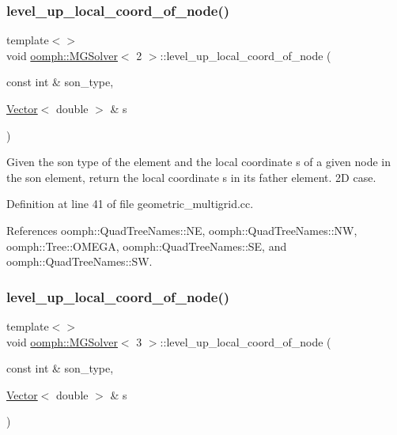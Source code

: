 \subsubsection{\texorpdfstring{level\+\_\+up\+\_\+local\+\_\+coord\+\_\+of\+\_\+node()}{level\_up\_local\_coord\_of\_node()}\hspace{0.1cm}{\footnotesize\ttfamily [1/3]}}
{\footnotesize\ttfamily template$<$$>$ \\
void \hyperlink{classoomph_1_1MGSolver}{oomph\+::\+M\+G\+Solver}$<$ 2 $>$\+::level\+\_\+up\+\_\+local\+\_\+coord\+\_\+of\+\_\+node (\begin{DoxyParamCaption}\item[{const int \&}]{son\+\_\+type,  }\item[{\hyperlink{classoomph_1_1Vector}{Vector}$<$ double $>$ \&}]{s }\end{DoxyParamCaption})}



Given the son type of the element and the local coordinate s of a given node in the son element, return the local coordinate s in its father element. 2D case. 



Definition at line 41 of file geometric\+\_\+multigrid.\+cc.



References oomph\+::\+Quad\+Tree\+Names\+::\+NE, oomph\+::\+Quad\+Tree\+Names\+::\+NW, oomph\+::\+Tree\+::\+O\+M\+E\+GA, oomph\+::\+Quad\+Tree\+Names\+::\+SE, and oomph\+::\+Quad\+Tree\+Names\+::\+SW.

\mbox{\label{classoomph_1_1MGSolver_a10d5478cec29adc2f6cba923e32ece27}} 
\subsubsection{\texorpdfstring{level\+\_\+up\+\_\+local\+\_\+coord\+\_\+of\+\_\+node()}{level\_up\_local\_coord\_of\_node()}\hspace{0.1cm}{\footnotesize\ttfamily [2/3]}}
{\footnotesize\ttfamily template$<$$>$ \\
void \hyperlink{classoomph_1_1MGSolver}{oomph\+::\+M\+G\+Solver}$<$ 3 $>$\+::level\+\_\+up\+\_\+local\+\_\+coord\+\_\+of\+\_\+node (\begin{DoxyParamCaption}\item[{const int \&}]{son\+\_\+type,  }\item[{\hyperlink{classoomph_1_1Vector}{Vector}$<$ double $>$ \&}]{s }\end{DoxyParamCaption})}




